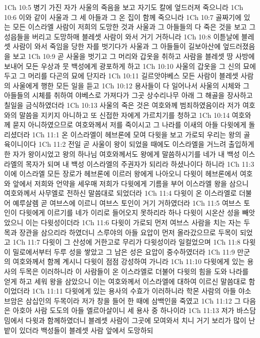 1Ch 10:5  병기 가진 자가 사울의 죽음을 보고 자기도 칼에 엎드러져 죽으니라
1Ch 10:6  이와 같이 사울과 그 세 아들과 그 온 집이 함께 죽으니라
1Ch 10:7  골짜기에 있는 모든 이스라엘 사람이 저희의 도망한 것과 사울과 그 아들들의 다 죽은 것을 보고 그 성읍들을 버리고 도망하매 블레셋 사람이 와서 거기 거하니라
1Ch 10:8  이튿날에 블레셋 사람이 와서 죽임을 당한 자를 벗기다가 사울과 그 아들들이 길보아산에 엎드러졌음을 보고
1Ch 10:9  곧 사울을 벗기고 그 머리와 갑옷을 취하고 사람을 블레셋 땅 사방에 보내어 모든 우상과 뭇 백성에게 광포하게 하고
1Ch 10:10  사울의 갑옷을 그 신의 묘에 두고 그 머리를 다곤의 묘에 단지라
1Ch 10:11  길르앗야베스 모든 사람이 블레셋 사람의 사울에게 행한 모든 일을 듣고
1Ch 10:12  용사들이 다 일어나서 사울의 시체와 그 아들들의 시체를 취하여 야베스로 가져다가 그곳 상수리나무 아래 그 해골을 장사하고 칠일을 금식하였더라
1Ch 10:13  사울의 죽은 것은 여호와께 범죄하였음이라 저가 여호와의 말씀을 지키지 아니하고 또 신접한 자에게 가르치기를 청하고
1Ch 10:14  여호와께 묻지 아니하였으므로 여호와께서 저를 죽이시고 그 나라를 이새의 아들 다윗에게 돌리셨더라
1Ch 11:1  온 이스라엘이 헤브론에 모여 다윗을 보고 가로되 우리는 왕의 골육이니이다
1Ch 11:2  전일 곧 사울이 왕이 되었을 때에도 이스라엘을 거느려 출입하게 한 자가 왕이시었고 왕의 하나님 여호와께서도 왕에게 말씀하시기를 네가 내 백성 이스라엘의 목자가 되며 내 백성 이스라엘의 주권자가 되리라 하셨나이다 하니라
1Ch 11:3  이에 이스라엘 모든 장로가 헤브론에 이르러 왕에게 나아오니 다윗이 헤브론에서 여호와 앞에서 저희와 언약을 세우매 저희가 다윗에게 기름을 부어 이스라엘 왕을 삼으니 여호와께서 사무엘로 전하신 말씀대로 되었더라
1Ch 11:4  다윗이 온 이스라엘로 더불어 예루살렘 곧 여브스에 이르니 여브스 토인이 거기 거하였더라
1Ch 11:5  여브스 토인이 다윗에게 이르기를 네가 이리로 들어오지 못하리라 하나 다윗이 시온산 성을 빼앗았으니 이는 다윗성이더라
1Ch 11:6  다윗이 가로되 먼저 여브스 사람을 치는 자는 두목과 장관을 삼으리라 하였더니 스루야의 아들 요압이 먼저 올라갔으므로 두목이 되었고
1Ch 11:7  다윗이 그 산성에 거한고로 무리가 다윗성이라 일컬었으며
1Ch 11:8  다윗이 밀로에서부터 두루 성을 쌓았고 그 남은 성은 요압이 중수하였더라
1Ch 11:9  만군의 여호와께서 함께 계시니 다윗이 점점 강성하여 가니라
1Ch 11:10  다윗에게 있는 용사의 두목은 이러하니라 이 사람들이 온 이스라엘로 더불어 다윗의 힘을 도와 나라를 얻게 하고 세워 왕을 삼았으니 이는 여호와께서 이스라엘에 대하여 이르신 말씀대로 함이었더라
1Ch 11:11  다윗에게 있는 용사의 수효가 이러하니라 학몬 사람의 아들 야소브암은 삼십인의 두목이라 저가 창을 들어 한 때에 삼백인을 죽였고
1Ch 11:12  그 다음은 아호아 사람 도도의 아들 엘르아살이니 세 용사 중 하나이라
1Ch 11:13  저가 바스담밈에서 다윗과 함께하였더니 블레셋 사람이 그곳에 모여와서 치니 거기 보리가 많이 난 밭이 있더라 백성들이 블레셋 사람 앞에서 도망하되
